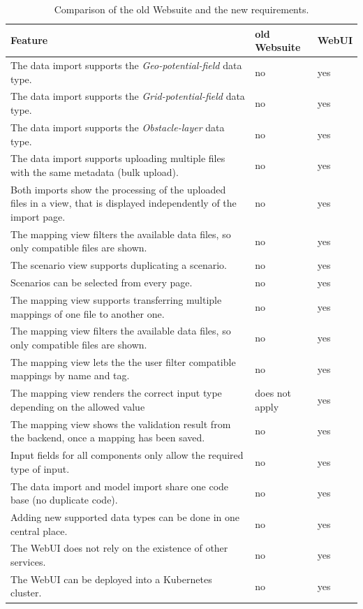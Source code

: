 \begin{table}[H]
	\caption{Comparison of the old Websuite and the new requirements.}
	\begin{tabularx}{\textwidth}{|X|l|l|}
	\hline
	\textbf{Feature} & \textbf{old Websuite} & \textbf{WebUI} \\ \hline
	The data import supports the \textit{Geo-potential-field} data type. & no & yes \\ \hline
	The data import supports the \textit{Grid-potential-field} data type. & no & yes \\ \hline
	The data import supports the \textit{Obstacle-layer} data type. & no & yes \\ \hline
	The data import supports uploading multiple files with the same metadata (bulk upload). & no & yes \\ \hline
	Both imports show the processing of the uploaded files in a view, that is displayed independently of the import page. & no & yes \\ \hline
	The mapping view filters the available data files, so only compatible files are shown. & no & yes \\ \hline
	The scenario view supports duplicating a scenario. & no & yes \\ \hline
	Scenarios can be selected from every page. & no & yes \\ \hline
	The mapping view supports transferring multiple mappings of one file to another one. & no & yes \\ \hline
	The mapping view filters the available data files, so only compatible files are shown. & no & yes \\ \hline
	The mapping view lets the the user filter compatible mappings by name and tag. & no & yes \\ \hline
	The mapping view renders the correct input type depending on the allowed value & does not apply & yes \\ \hline
	The mapping view shows the validation result from the backend, once a mapping has been saved. & no & yes \\ \hline
	Input fields for all components only allow the required type of input. & no & yes \\ \hline
	The data import and model import share one code base (no duplicate code). & no & yes \\ \hline
	Adding new supported data types can be done in one central place. & no & yes \\ \hline
	The WebUI does not rely on the existence of other services. & no & yes \\ \hline
	The WebUI can be deployed into a Kubernetes cluster. & no & yes \\ \hline
	\end{tabularx}
\end{table}
